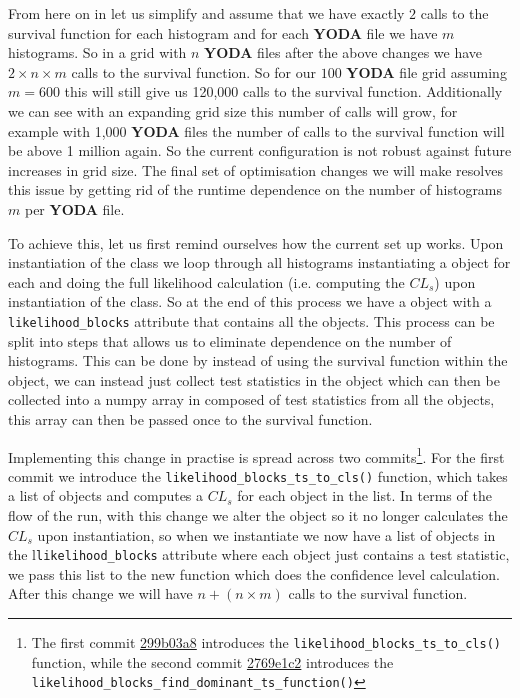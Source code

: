 From here on in let us simplify and assume that we have exactly $2$ calls to the survival function for each histogram and for each \textbf{YODA} file we have $m$ histograms. So in a grid with $n$ \textbf{YODA} files after the above changes we have $2\times n\times m$ calls to the survival function. So for our $100$ \textbf{YODA} file grid assuming $m=600$ this will still give us 120,000 calls to the survival function. Additionally we can see with an expanding grid size this number of calls will grow, for example with 1,000 \textbf{YODA} files the number of calls to the survival function will be above 1 million again. So the current configuration is not robust against future increases in grid size. The final set of optimisation changes we will make resolves this issue by getting rid of the runtime dependence on the number of histograms $m$ per \textbf{YODA} file.

To achieve this, let us first remind ourselves how the current set up works. Upon instantiation of the  class we loop through all histograms instantiating a  object for each and doing the full likelihood calculation (i.e. computing the $CL_s$) upon instantiation of the  class. So at the end of this process we have a  object with a \texttt{likelihood\_blocks} attribute that contains all the  objects. This process can be split into steps that allows us to eliminate dependence on the number of histograms. This can be done by instead of using the survival function within the  object, we can instead just collect test statistics in the  object which can then be collected into a numpy array in  composed of test statistics from all the   objects, this array can then be passed once to the survival function.

Implementing this change in practise is spread across two commits\footnote{The first commit \href{https://gitlab.com/hepcedar/contur/-/commit/299b03a86812b47e30ed66d4f82a59a3584cf523}{299b03a8} introduces the \texttt{likelihood\_blocks\_ts\_to\_cls()} function, while the second commit \href{https://gitlab.com/hepcedar/contur/-/commit/2769e1c2a020efd2de2919db2413309eef8a8e64}{2769e1c2} introduces the \texttt{likelihood\_blocks\_find\_dominant\_ts\_function()}}. For the first commit we introduce the \texttt{likelihood\_blocks\_ts\_to\_cls()} function, which takes a list of  objects and computes a $CL_s$ for each  object in the list. In terms of the flow of the run, with this change we alter the  object so it no longer calculates the $CL_s$ upon instantiation, so when we instantiate  we now have a list of  objects in the l\texttt{likelihood\_blocks} attribute where each  object just contains a test statistic, we pass this list to the new function which does the confidence level calculation. After this change we will have $n + (n\times m)$ calls to the survival function.

